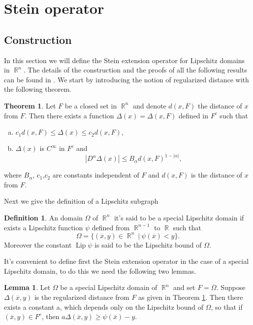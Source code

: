 \documentclass[12pt]{article}
\theoremstyle{definition}
\newtheorem{definition}{Definition}
\newtheorem{theorem}{Theorem}
\newtheorem{lemma}{Lemma}
\DeclareMathOperator\Lip{Lip}
\DeclareMathOperator\rr{\mathbb{R}}
\begin{document}
\section{Stein operator}

\subsection{Construction}
In this section we will define the Stein extension operator for Lipschitz domains in $\rr^n$. The details of the construction and the proofs of all the following results can be found in \cite[Section 2-3, Ch. VI]{stein}. We start by introducing the notion of regularized distance with the following theorem.

\begin{theorem}\label{regdist}
Let $F$ be a closed set in $\rr^n$ and denote $d(x,F)$ the distance of $x$ from $F$. Then there exists a function $\Delta(x)=\Delta(x,F)$ defined in $F^c$ such that
\begin{enumerate}[a)]
\item $c_1 d(x,F)\le \Delta(x)\le c_2d (x,F),$  
\item $\Delta(x)$ is $C^\infty$ in $F^c$ and
\[ \left | D^\alpha \Delta(x) \right | \le B_\alpha d(x,F)^{1-|\alpha|},\]
\end{enumerate}
where $B_\alpha$, $c_1$,$c_2$ are constants independent of $F$ and $d(x,F)$ is the distance of $x$ from $F.$
\end{theorem}
Next we give the definition of a Lipschitz subgraph 
\begin{definition}
An domain $\Omega$ of $\rr^n$ it's said to be a special Lipschitz domain if exists a Lipschitz function $\psi$ defined from $\rr^{n-1}$ to $\rr$ such that
\[ \Omega=\{(\overline x, y) \in \rr^n \ | \ \psi(\overline x)<y \}.\]
Moreover the constant $\Lip \psi$ is said to be the Lipschitz bound of $\Omega.$ 
\end{definition}
It's convenient to define first the Stein extension operator in the case of a special Lipschitz domain, to do this we need the following two lemmas.
\begin{lemma}\label{lemma1}
Let $\Omega$ be a special Lipschitz domain of $\rr^n$ and set $F=\overline \Omega$. Suppose $\Delta(\overline x, y)$ is the regularized distance from $F$ as given in Theorem \ref{regdist}. Then there exists a constant a, which depends only on the Lipschitz bound of $\Omega$, so that if $(\overline x, y) \in F^c$, then $a\Delta(\overline x,y)\ge \psi(\overline x)- y.$
\end{lemma}
\end{document}
